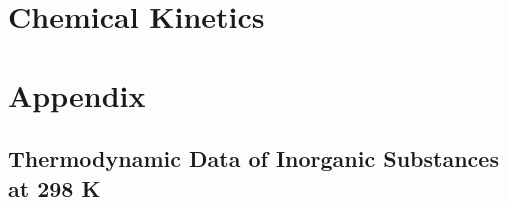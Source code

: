 \documentclass[
]{book}
\theoremstyle{definition}
\theoremstyle{definition}
\theoremstyle{definition}
\theoremstyle{remark}
\begin{document}
\hypertarget{Kinetics}{%
\chapter{Chemical Kinetics}\label{Kinetics}}

\renewcommand*{\standardstate}{{-\kern-6pt{\ominus}\kern-6pt-}}

\hypertarget{appendix}{%
\chapter{Appendix}\label{appendix}}

\hypertarget{thermodynamic-data-of-inorganic-substances-at-298-k}{%
\section{Thermodynamic Data of Inorganic Substances at 298 K}\label{thermodynamic-data-of-inorganic-substances-at-298-k}}

\tiny
\end{document}
